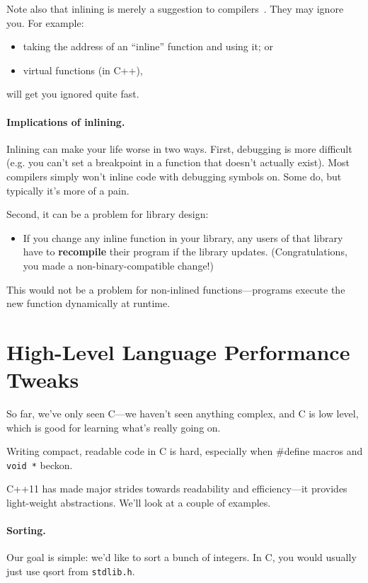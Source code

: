   Note also that inlining is merely a suggestion to compilers~\cite{gcc:inlining}.
  They may ignore you.
  For example:
  \begin{itemize}
    \item taking the address of an ``inline'' function and using it; or
    \item virtual functions (in C++),
  \end{itemize}
  will get you ignored quite fast.

\paragraph{Implications of inlining.} Inlining can make your life worse in two ways.
First, debugging is more difficult (e.g. you can't set a breakpoint in a function that
  doesn't actually exist).
 Most compilers simply won't inline code with debugging symbols on.
 Some do, but typically it's more of a pain.

Second, it can be a problem for library design:
  \begin{itemize}
    \item If you change any inline function in your library, any users
      of that library have to {\bf recompile} their program if the
      library updates. (Congratulations, you made a non-binary-compatible change!)
  \end{itemize}
This would not be a problem for non-inlined functions---programs execute the new function
dynamically at runtime.

\section*{High-Level Language Performance Tweaks}
So far, we've only seen C---we haven't seen anything complex, and C is
low level, which is good for learning what's really going on.

 Writing compact, readable code in C is hard, especially when \#define
macros and {\tt void *} beckon.

    C++11 has made major strides towards readability and
    efficiency---it provides light-weight abstractions. We'll look at
    a couple of examples.

\paragraph{Sorting.} Our goal is simple: we'd like to sort a bunch of integers.
In C, you would usually just use qsort from {\tt stdlib.h}.

